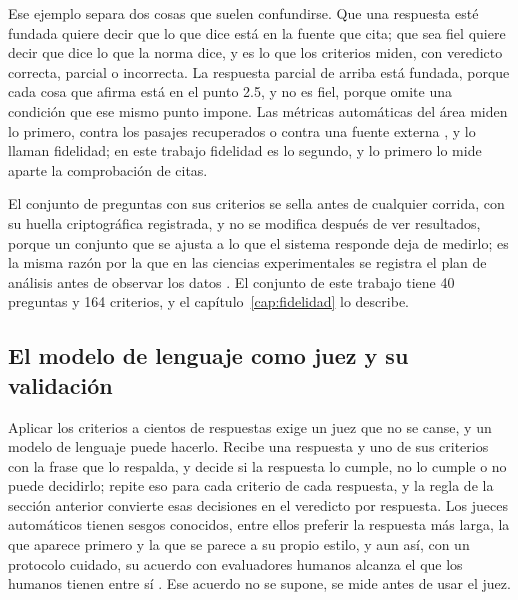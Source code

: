 \documentclass[12pt,a4paper]{report}
\begin{document}
Ese ejemplo separa dos cosas que suelen confundirse. Que una respuesta esté fundada quiere decir que lo que dice está en la fuente que cita; que sea fiel quiere decir que dice lo que la norma dice, y es lo que los criterios miden, con veredicto correcta, parcial o incorrecta. La respuesta parcial de arriba está fundada, porque cada cosa que afirma está en el punto 2.5, y no es fiel, porque omite una condición que ese mismo punto impone. Las métricas automáticas del área miden lo primero, contra los pasajes recuperados \cite{es2024ragas} o contra una fuente externa \cite{min2023factscore}, y lo llaman fidelidad; en este trabajo fidelidad es lo segundo, y lo primero lo mide aparte la comprobación de citas.

El conjunto de preguntas con sus criterios se sella antes de cualquier corrida, con su huella criptográfica registrada, y no se modifica después de ver resultados, porque un conjunto que se ajusta a lo que el sistema responde deja de medirlo; es la misma razón por la que en las ciencias experimentales se registra el plan de análisis antes de observar los datos \cite{nosek2018preregistration}. El conjunto de este trabajo tiene 40 preguntas y 164 criterios, y el capítulo~\ref{cap:fidelidad} lo describe.

\subsection{El modelo de lenguaje como juez y su validación}

Aplicar los criterios a cientos de respuestas exige un juez que no se canse, y un modelo de lenguaje puede hacerlo. Recibe una respuesta y uno de sus criterios con la frase que lo respalda, y decide si la respuesta lo cumple, no lo cumple o no puede decidirlo; repite eso para cada criterio de cada respuesta, y la regla de la sección anterior convierte esas decisiones en el veredicto por respuesta. Los jueces automáticos tienen sesgos conocidos, entre ellos preferir la respuesta más larga, la que aparece primero y la que se parece a su propio estilo, y aun así, con un protocolo cuidado, su acuerdo con evaluadores humanos alcanza el que los humanos tienen entre sí \cite{zheng2023judge}. Ese acuerdo no se supone, se mide antes de usar el juez.
\end{document}
